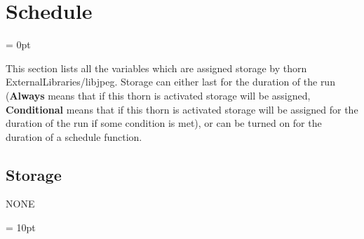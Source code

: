 
\section{Schedule} 


\parskip = 0pt


\noindent This section lists all the variables which are assigned storage by thorn ExternalLibraries/libjpeg.  Storage can either last for the duration of the run ({\bf Always} means that if this thorn is activated storage will be assigned, {\bf Conditional} means that if this thorn is activated storage will be assigned for the duration of the run if some condition is met), or can be turned on for the duration of a schedule function.


\subsection*{Storage}NONE

\vspace{5mm}\parskip = 10pt 
